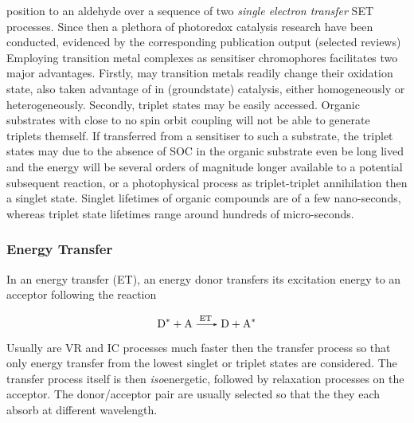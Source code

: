 \ce{\alpha} position to an aldehyde over a sequence of two \emph{single electron transfer} SET processes. %
			Since then a plethora of photoredox catalysis research have been conducted, evidenced by the corresponding publication output (selected reviews) %
			Employing transition metal complexes as sensitiser chromophores facilitates two major advantages. Firstly, may transition metals readily change their oxidation state, also taken advantage of in (groundstate) catalysis, either homogeneously or heterogeneously. Secondly, triplet states may be easily accessed. Organic substrates with close to no spin orbit coupling will not be able to generate triplets themself. If transferred from a sensitiser to such a substrate, the triplet states may due to the absence of SOC in the organic substrate even be long lived and the energy will be several orders of magnitude longer available to a potential subsequent reaction, or a photophysical process as triplet-triplet annihilation then a singlet state. Singlet lifetimes of organic compounds are of a few nano-seconds, whereas triplet state lifetimes range around hundreds of micro-seconds.

			\subsubsection{Energy Transfer}
			\label{sec:eTrans}
			In an energy transfer (ET), an energy donor  transfers its excitation energy to an acceptor  following the reaction

			\begin{equation}
				\ce{D^{\ast} + A ->[ET] D + A^{\ast}}
			\end{equation}

			Usually are VR and IC processes much faster then the transfer process so that only energy transfer from the lowest singlet or triplet states are considered. The transfer process itself is then \textit{iso}energetic, followed by relaxation processes on the acceptor. The donor/acceptor pair are usually selected so that the they each absorb at different wavelength.

